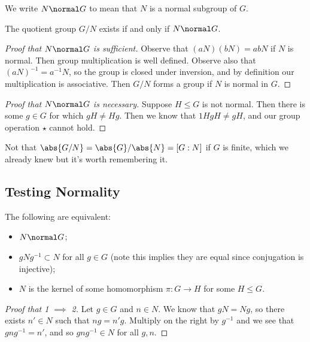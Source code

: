 \begin{notation}[$\normal$]
We write $N \normal G$ to mean that $N$ is a normal subgroup of $G$.
\end{notation}

\begin{theorem}
The quotient group $G / N$ exists if and only if $N \normal G$.
\end{theorem}

\begin{proof}[Proof that $N \normal G$ is sufficient]
Observe that $(aN)(bN) = abN$ if $N$ is normal. Then group multiplication is well defined. Observe also that $(aN)^{-1} = a^{-1}N$, so the group is closed under inversion, and by definition our multiplication is associative. Then $G/N$ forms a group if $N$ is normal in $G$.
\end{proof}

\begin{proof}[Proof that $N \normal G$ is necessary]
Suppose $H \leq G$ is not normal. Then there is some $g \in G$ for which $gH \not= Hg$. Then we know that $1HgH \not= gH$, and our group operation $\star$ cannot hold.
\end{proof}

Not that $\abs{G/N} = \abs{G} / \abs{N} = [G : N]$ if $G$ is finite, which we already knew but it's worth remembering it.

\subsection{Testing Normality}

\begin{proposition}
The following are equivalent:
\begin{itemize}
\item $N \normal G$;
\item $gNg^{-1} \subset N$ for all $g \in G$ (note this implies they are equal since conjugation is injective);
\item $N$ is the kernel of some homomorphism $\pi : G \to H$ for some $H \leq G$.
\end{itemize}
\end{proposition}

\begin{proof}[Proof that 1 $\implies$ 2]
Let $g \in G$ and $n \in N$. We know that $gN = Ng$, so there exists $n' \in N$ such that $ng = n'g$. Multiply on the right by $g^{-1}$ and we see that $gng^{-1} = n'$, and so $gng^{-1} \in N$ for all $g,n$.
\end{proof}


